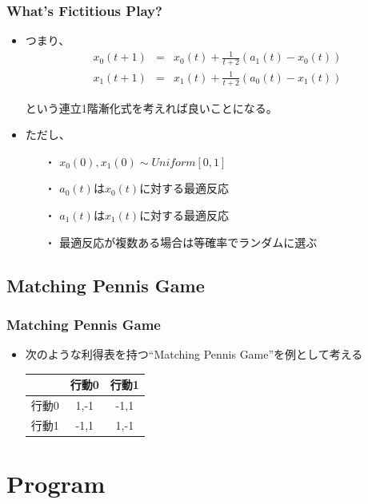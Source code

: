 \documentclass[dvipdfmx,11pt]{beamer}
\begin{document}
\begin{frame}\frametitle{What's Fictitious Play?}
 \begin{itemize}
 \item つまり、
  \begin{eqnarray*}
  x_{0}(t+1)&=&x_{0}(t)+\frac{1}{t+2}(a_{1}(t)-x_{0}(t))\\
  x_{1}(t+1)&=&x_{1}(t)+\frac{1}{t+2}(a_{0}(t)-x_{1}(t))
  \end{eqnarray*}
  \item[] という連立1階漸化式を考えれば良いことになる。
  \item ただし、
  \begin{itemize}
   \item[・] $x_{0}(0), x_{1}(0) \sim Uniform[0,1]$
   \item[・] $a_{0}(t)$は$x_{0}(t)$に対する最適反応
   \item[・] $a_{1}(t)$は$x_{1}(t)$に対する最適反応
   \item[・] 最適反応が複数ある場合は等確率でランダムに選ぶ
  \end{itemize}
 \end{itemize}
\end{frame}

\subsection{Matching Pennis Game}
\begin{frame}\frametitle{Matching Pennis Game}
 \begin{itemize}
  \item 次のような利得表を持つ``Matching Pennis Game''を例として考える
  \begin{table}
   \begin{tabular}{|c||c|c|} \hline
    　 & 行動0 & 行動1 \\ \hline \hline
    行動0 & 1,-1 & -1,1 \\ \hline
    行動1 & -1,1 & 1,-1 \\ \hline
   \end{tabular}
  \end{table}
 \end{itemize}
\end{frame}

\section{Program}
\end{document}
